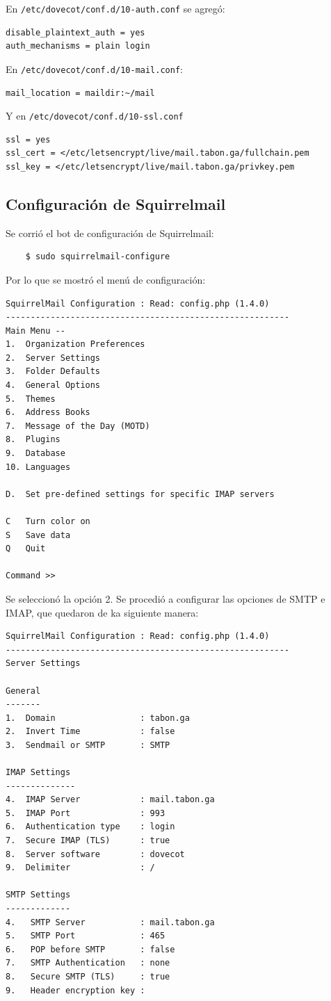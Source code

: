 \documentclass[12pt]{article}
\begin{document}
En \texttt{/etc/dovecot/conf.d/10-auth.conf} se agregó:
\begin{verbatim}
disable_plaintext_auth = yes
auth_mechanisms = plain login
\end{verbatim}

En \texttt{/etc/dovecot/conf.d/10-mail.conf}:
\begin{verbatim}
mail_location = maildir:~/mail
\end{verbatim}

Y en \texttt{/etc/dovecot/conf.d/10-ssl.conf}
\begin{verbatim}
ssl = yes
ssl_cert = </etc/letsencrypt/live/mail.tabon.ga/fullchain.pem
ssl_key = </etc/letsencrypt/live/mail.tabon.ga/privkey.pem
\end{verbatim}

\subsection{Configuración de Squirrelmail}
Se corrió el bot de configuración de Squirrelmail:
\begin{verbatim}
    $ sudo squirrelmail-configure
\end{verbatim}

Por lo que se mostró el menú de configuración:

\begin{verbatim}
SquirrelMail Configuration : Read: config.php (1.4.0)
---------------------------------------------------------
Main Menu --
1.  Organization Preferences
2.  Server Settings
3.  Folder Defaults
4.  General Options
5.  Themes
6.  Address Books
7.  Message of the Day (MOTD)
8.  Plugins
9.  Database
10. Languages

D.  Set pre-defined settings for specific IMAP servers

C   Turn color on
S   Save data
Q   Quit

Command >> 
\end{verbatim}

Se seleccionó la opción 2. Se procedió a configurar las opciones de SMTP e IMAP, que quedaron de ka siguiente manera:

\begin{verbatim}
SquirrelMail Configuration : Read: config.php (1.4.0)
---------------------------------------------------------
Server Settings

General
-------
1.  Domain                 : tabon.ga
2.  Invert Time            : false
3.  Sendmail or SMTP       : SMTP

IMAP Settings
--------------
4.  IMAP Server            : mail.tabon.ga
5.  IMAP Port              : 993
6.  Authentication type    : login
7.  Secure IMAP (TLS)      : true
8.  Server software        : dovecot
9.  Delimiter              : /

SMTP Settings
-------------
4.   SMTP Server           : mail.tabon.ga
5.   SMTP Port             : 465
6.   POP before SMTP       : false
7.   SMTP Authentication   : none
8.   Secure SMTP (TLS)     : true
9.   Header encryption key : 
\end{verbatim}
\end{document}
